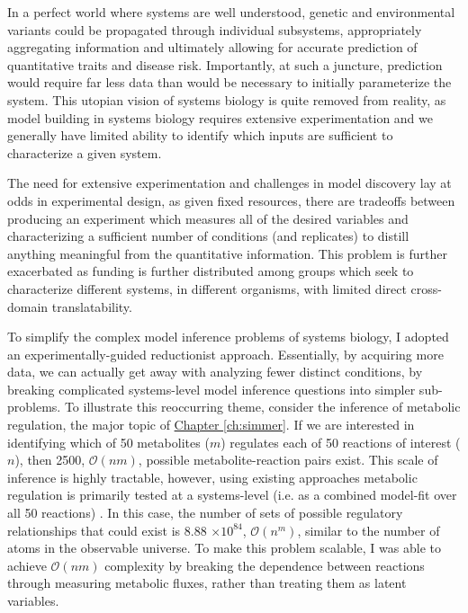 In a perfect world where systems are well understood, genetic and environmental variants could be propagated through individual subsystems, appropriately aggregating information and ultimately allowing for accurate prediction of quantitative traits and disease risk.  Importantly, at such a juncture, prediction would require far less data than would be necessary to initially parameterize the system. This utopian vision of systems biology is quite removed from reality, as model building in systems biology requires extensive experimentation and we generally have limited ability to identify which inputs are sufficient to characterize a given system.

The need for extensive experimentation and challenges in model discovery lay at odds in experimental design, as given fixed resources, there are tradeoffs between producing an experiment which measures all of the desired variables and characterizing a sufficient number of conditions (and replicates) to distill anything meaningful from the quantitative information. This problem is further exacerbated as funding is further distributed among groups which seek to characterize different systems, in different organisms, with limited direct cross-domain translatability. 

To simplify the complex model inference problems of systems biology, I adopted an experimentally-guided reductionist approach. Essentially, by acquiring more data, we can actually get away with analyzing fewer distinct conditions, by breaking complicated systems-level model inference questions into simpler sub-problems. To illustrate this reoccurring theme, consider the inference of metabolic regulation, the major topic of \hyperref[ch:simmer]{Chapter \ref{ch:simmer}}. If we are interested in identifying which of 50 metabolites ($m$) regulates each of 50 reactions of interest ($n$), then 2500, $\mathcal{O}(nm)$, possible metabolite-reaction pairs exist. This scale of inference is highly tractable, however, using existing approaches metabolic regulation is primarily tested at a systems-level (i.e. as a combined model-fit over all 50 reactions) \cite{Link:2013dj, Zampar:2013fr}.  In this case, the number of sets of possible regulatory relationships that could exist is 8.88 $\times 10^{84}$, $\mathcal{O}(n^{m})$, similar to the number of atoms in the observable universe. To make this problem scalable, I was able to achieve $\mathcal{O}(nm)$ complexity by breaking the dependence between reactions through measuring metabolic fluxes, rather than treating them as latent variables.

